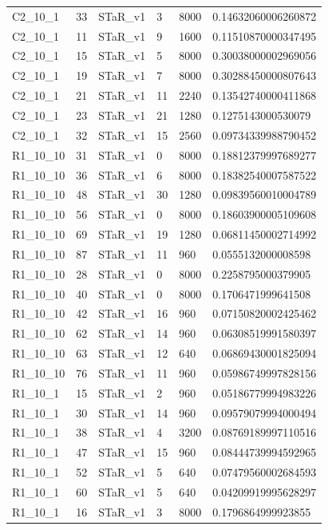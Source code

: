 \begin{tabular}{llllll}
 C2\_10\_1 & 33 & STaR\_v1 & 3 & 8000 & 0.14632060006260872 \\
 C2\_10\_1 & 11 & STaR\_v1 & 9 & 1600 & 0.11510870000347495 \\
 C2\_10\_1 & 15 & STaR\_v1 & 5 & 8000 & 0.30038000002969056 \\
 C2\_10\_1 & 19 & STaR\_v1 & 7 & 8000 & 0.30288450000807643 \\
 C2\_10\_1 & 21 & STaR\_v1 & 11 & 2240 & 0.13542740000411868 \\
 C2\_10\_1 & 23 & STaR\_v1 & 21 & 1280 & 0.1275143000530079 \\
 C2\_10\_1 & 32 & STaR\_v1 & 15 & 2560 & 0.09734339988790452 \\
 R1\_10\_10 & 31 & STaR\_v1 & 0 & 8000 & 0.18812379997689277 \\
 R1\_10\_10 & 36 & STaR\_v1 & 6 & 8000 & 0.18382540007587522 \\
 R1\_10\_10 & 48 & STaR\_v1 & 30 & 1280 & 0.09839560010004789 \\
 R1\_10\_10 & 56 & STaR\_v1 & 0 & 8000 & 0.18603900005109608 \\
 R1\_10\_10 & 69 & STaR\_v1 & 19 & 1280 & 0.06811450002714992 \\
 R1\_10\_10 & 87 & STaR\_v1 & 11 & 960 & 0.0555132000008598 \\
 R1\_10\_10 & 28 & STaR\_v1 & 0 & 8000 & 0.2258795000379905 \\
 R1\_10\_10 & 40 & STaR\_v1 & 0 & 8000 & 0.1706471999641508 \\
 R1\_10\_10 & 42 & STaR\_v1 & 16 & 960 & 0.07150820002425462 \\
 R1\_10\_10 & 62 & STaR\_v1 & 14 & 960 & 0.06308519991580397 \\
 R1\_10\_10 & 63 & STaR\_v1 & 12 & 640 & 0.06869430001825094 \\
 R1\_10\_10 & 76 & STaR\_v1 & 11 & 960 & 0.05986749997828156 \\
 R1\_10\_1 & 15 & STaR\_v1 & 2 & 960 & 0.05186779994983226 \\
 R1\_10\_1 & 30 & STaR\_v1 & 14 & 960 & 0.09579079994000494 \\
 R1\_10\_1 & 38 & STaR\_v1 & 4 & 3200 & 0.08769189997110516 \\
 R1\_10\_1 & 47 & STaR\_v1 & 15 & 960 & 0.08444739994592965 \\
 R1\_10\_1 & 52 & STaR\_v1 & 5 & 640 & 0.07479560002684593 \\
 R1\_10\_1 & 60 & STaR\_v1 & 5 & 640 & 0.04209919995628297 \\
 R1\_10\_1 & 16 & STaR\_v1 & 3 & 8000 & 0.1796864999923855 \\

\end{tabular}

